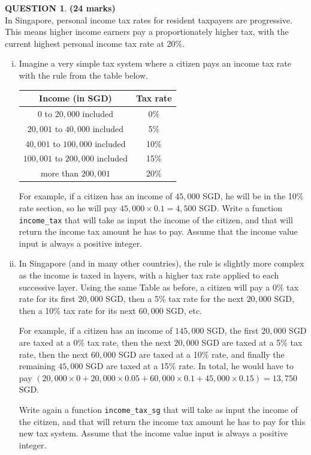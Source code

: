 \documentclass[a4paper,12pt]{article}
\theoremstyle{definition}
\newtheorem{ques}[dummy]{QUESTION}
\theoremstyle{plain}
\newcommand{\ttx}[1]{\texttt{#1}}
\begin{document}
\begin{ques}\hfill \textbf{(24 marks)}\vspace*{2em}\\
	In Singapore, personal income tax rates for resident taxpayers are progressive. This means higher income earners pay a proportionately higher tax, with the current highest personal income tax rate at 20\%.
	
	\begin{enumerate}[(i)]
		\item Imagine a very simple tax system where a citizen pays an income tax rate with the rule from the table below.
		\begin{table}[H]
			\centering
			\begin{tabular}{|c|c|}
				\hline
				\textbf{Income} (in SGD) & \textbf{Tax rate}\\
				\hline
				$0$ to $20,000$ included & 0\%\\
				$20,001$ to $40,000$ included & 5\%\\
				$40,001$ to $100,000$ included & 10\%\\
				$100,001$ to $200,000$ included & 15\%\\
				more than $200,001$ & 20\%\\
				\hline
			\end{tabular}
		\end{table}
		For example, if a citizen has an income of $45,000$ SGD, he will be in the 10\% rate section, so he will pay $45,000\times 0.1 = 4,500$ SGD. Write a function \ttx{income\_tax} that will take as input the income of the citizen, and that will return the income tax amount he has to pay. Assume that the income value input is always a positive integer.
		
		
		\item In Singapore (and in many other countries), the rule is slightly more complex as the income is taxed in layers, with a higher tax rate applied to each successive layer. Using the same Table as before, a citizen will pay a 0\% tax rate for its first $20,000$ SGD, then a 5\% tax rate for the next $20,000$ SGD, then a 10\% tax rate for its next $60,000$ SGD, etc.
		
		For example, if a citizen has an income of $145,000$ SGD, the first $20,000$ SGD are taxed at a 0\% tax rate, then the next $20,000$ SGD are taxed at a 5\% tax rate, then the next $60,000$ SGD are taxed at a 10\% rate, and finally the remaining $45,000$ SGD are taxed at a 15\% rate. In total, he would have to pay $(20,000\times 0 + 20,000\times 0.05 + 60,000 \times 0.1 + 45,000\times 0.15) = 13,750$ SGD.
		
		Write again a function \ttx{income\_tax\_sg} that will take as input the income of the citizen, and that will return the income tax amount he has to pay for this new tax system. Assume that the income value input is always a positive integer.
	\end{enumerate}
\end{ques}
\end{document}
